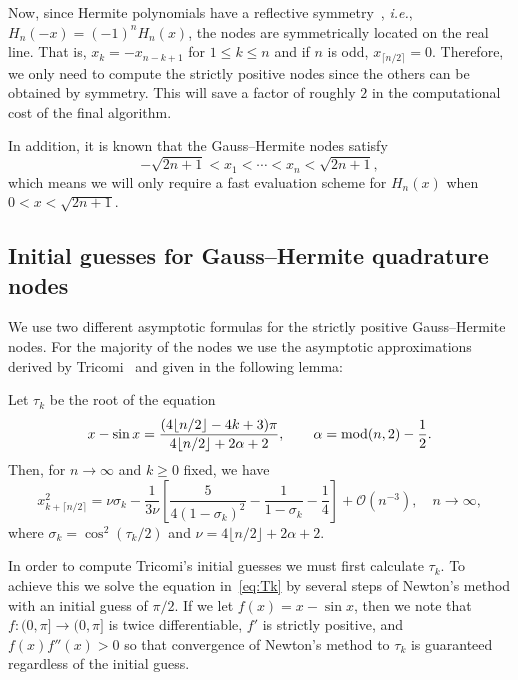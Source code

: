 \documentclass[final]{siamltex}
\begin{document}
Now, since Hermite polynomials have a reflective symmetry~\cite[(18.6.1)]{NISTHandbook}, \emph{i.e.}, 
$H_n(-x) = (-1)^{n}H_n(x)$, the nodes are symmetrically located on the real line. That is, 
$x_{k} = -x_{n-k+1}$ for $1\leq k \leq n$ and if $n$ is odd, $x_{\lceil n/2\rceil}=0$. 
Therefore, we only need to compute the strictly positive nodes since the others can be obtained by symmetry. 
This will save a factor of roughly $2$ in the computational cost of the final algorithm.

In addition, it is known that the Gauss--Hermite nodes satisfy~\cite[(18.16.16)]{NISTHandbook} 
\[
 -\sqrt{2n+1}<x_1<\cdots<x_n<\sqrt{2n+1},
\]
which means we will only require a fast evaluation scheme for $H_n(x)$ when $0< x< \sqrt{2n+1}$.

\subsection{Initial guesses for Gauss--Hermite quadrature nodes}\label{sec:initialGuesses}
We use two different asymptotic formulas for the strictly positive Gauss--Hermite nodes. For the majority of the nodes 
we use the asymptotic approximations derived by Tricomi~\cite{Tricomi_49_01} and given in the following lemma:
\begin{lemma}
Let $\tau_{k}$ be the root of the equation 
\begin{equation}
x - \sin x = \frac{(4\lfloor n/2\rfloor-4k+3)\pi}{4\lfloor n/2\rfloor +2\alpha + 2}, \qquad \alpha = {\rm mod}(n,2) - \frac{1}{2}.
\label{eq:Tk}
\end{equation} 
Then, for $n\rightarrow\infty$ and $k\geq 0$ fixed, we have 
\[
x_{k+\lceil n/2\rceil}^2 = \nu \sigma_{k} - \frac{1}{3\nu}\left[\frac{5}{4(1-\sigma_{k})^2} - \frac{1}{1-\sigma_{k}} - \frac{1}{4} \right] + \mathcal{O}(n^{-3}), \quad n\rightarrow\infty,
\]
where $\sigma_{k} = \cos^2(\tau_{k}/2)$ and $\nu = 4\lfloor n/2\rfloor + 2\alpha + 2$. 
\label{lem:tricomi}
\end{lemma} 

In order to compute Tricomi's initial guesses we must first calculate $\tau_k$. To achieve this we 
solve the equation 
in~\eqref{eq:Tk} by several steps of Newton's method with an initial guess of $\pi/2$. If we let $f(x) = x-\sin x$, then 
we note that $f:(0,\pi]\rightarrow(0,\pi]$ is twice differentiable, $f'$ is strictly positive, 
and $f(x)f''(x)>0$ so that convergence of Newton's method to $\tau_k$ is guaranteed regardless of the initial guess.
\end{document}
